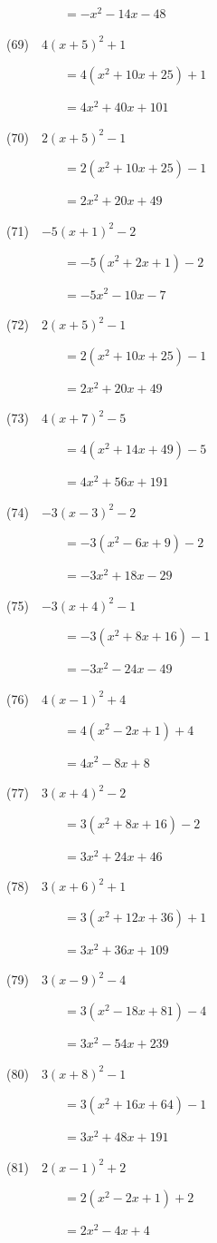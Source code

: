 \documentclass[a4j,twocolumn,10pt,fleqn]{jarticle}
\begin{document}
~~~~~~~~~$=-x^2-14x-48$

(69)~~$4(x +5)^2 +1$

~~~~~~~~~$=4(x^2 +10x +25) +1$

~~~~~~~~~$=4x^2 +40x +101$

(70)~~$2(x +5)^2-1$

~~~~~~~~~$=2(x^2 +10x +25)-1$

~~~~~~~~~$=2x^2 +20x +49$

(71)~~$-5(x +1)^2-2$

~~~~~~~~~$=-5(x^2 +2x +1)-2$

~~~~~~~~~$=-5x^2-10x-7$

(72)~~$2(x +5)^2-1$

~~~~~~~~~$=2(x^2 +10x +25)-1$

~~~~~~~~~$=2x^2 +20x +49$

(73)~~$4(x +7)^2-5$

~~~~~~~~~$=4(x^2 +14x +49)-5$

~~~~~~~~~$=4x^2 +56x +191$

(74)~~$-3(x-3)^2-2$

~~~~~~~~~$=-3(x^2-6x +9)-2$

~~~~~~~~~$=-3x^2 +18x-29$

(75)~~$-3(x +4)^2-1$

~~~~~~~~~$=-3(x^2 +8x +16)-1$

~~~~~~~~~$=-3x^2-24x-49$

(76)~~$4(x-1)^2 +4$

~~~~~~~~~$=4(x^2-2x +1) +4$

~~~~~~~~~$=4x^2-8x +8$

(77)~~$3(x +4)^2-2$

~~~~~~~~~$=3(x^2 +8x +16)-2$

~~~~~~~~~$=3x^2 +24x +46$

(78)~~$3(x +6)^2 +1$

~~~~~~~~~$=3(x^2 +12x +36) +1$

~~~~~~~~~$=3x^2 +36x +109$

(79)~~$3(x-9)^2-4$

~~~~~~~~~$=3(x^2-18x +81)-4$

~~~~~~~~~$=3x^2-54x +239$

(80)~~$3(x +8)^2-1$

~~~~~~~~~$=3(x^2 +16x +64)-1$

~~~~~~~~~$=3x^2 +48x +191$

(81)~~$2(x-1)^2 +2$

~~~~~~~~~$=2(x^2-2x +1) +2$

~~~~~~~~~$=2x^2-4x +4$
\end{document}
